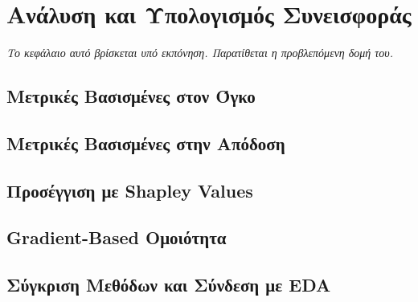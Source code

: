 \chapter{Ανάλυση και Υπολογισμός Συνεισφοράς}
\label{ch:contribution}

\noindent\textit{Το κεφάλαιο αυτό βρίσκεται υπό εκπόνηση. Παρατίθεται η προβλεπόμενη δομή του.}

\section{Μετρικές Βασισμένες στον Όγκο}
\section{Μετρικές Βασισμένες στην Απόδοση}
\section{Προσέγγιση με Shapley Values}
\section{Gradient-Based Ομοιότητα}
\section{Σύγκριση Μεθόδων και Σύνδεση με EDA}
